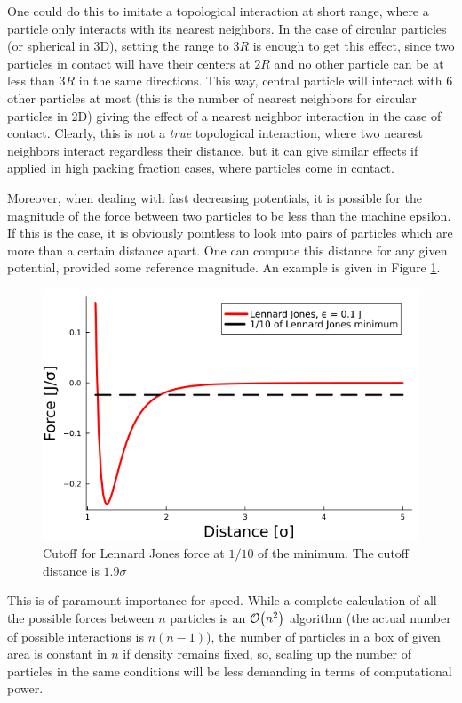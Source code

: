 \documentclass[../../master_thesis_np.tex]{subfiles}
\begin{document}
	One could do this to imitate a topological interaction at short range, where a particle only interacts with its nearest neighbors. In the case of circular particles (or spherical in 3D), setting the range to $3R$ is enough to get this effect, since two particles in contact will have their centers at $2R$ and no other particle can be at less than $3R$ in the same directions. This way, central particle will interact with 6 other particles at most (this is the number of nearest neighbors for circular particles in 2D) giving the effect of a nearest neighbor interaction in the case of contact. Clearly, this is not a \emph{true} topological interaction, where two nearest neighbors interact regardless their distance, but it can give similar effects if applied in high packing fraction cases, where particles come in contact.
	
	Moreover, when dealing with fast decreasing potentials, it is possible for the magnitude of the force between two particles to be less than the machine epsilon. If this is the case, it is obviously pointless to look into pairs of particles which are more than a certain distance apart. One can compute this distance for any given potential, provided some reference magnitude. An example is given in Figure \ref{fig:force_zero}.
	\begin{figure}[htp]
		\centering
		\includegraphics[width=\textwidth]{lj_zero.png}
		\caption{Cutoff for Lennard Jones force at $1/10$ of the minimum. The cutoff distance is $1.9\sigma$}
		\label{fig:force_zero}
	\end{figure}
	This is of paramount importance for speed. While a complete calculation of all the possible forces between $n$ particles is an $\order{n^2}$ algorithm (the actual number of possible interactions is $n(n-1)$), the number of particles in a box of given area is constant in $n$ if density remains fixed, so, scaling up the number of particles in the same conditions will be less demanding in terms of computational power.
	
\end{document}
